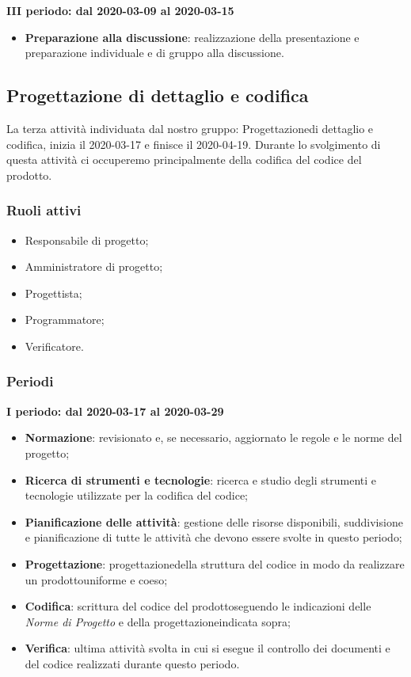 \textbf{III periodo: dal 2020-03-09 al 2020-03-15}
\begin{itemize}
	\item \textbf{Preparazione alla discussione}: realizzazione della presentazione e preparazione individuale e di gruppo alla discussione.
\end{itemize}

\subsection{Progettazione di dettaglio e codifica}
La terza attività individuata dal nostro gruppo: Progettazione\glosp di dettaglio e codifica, inizia il 2020-03-17 e finisce il 2020-04-19. Durante lo svolgimento di questa attività ci occuperemo principalmente della codifica del codice del prodotto\glo.

\subsubsection{Ruoli attivi}
\begin{itemize}
	\item Responsabile di progetto\glo;
	\item Amministratore di progetto\glo;
	\item Progettista;
	\item Programmatore;
	\item Verificatore.
\end{itemize}

\subsubsection{Periodi}
\textbf{I periodo: dal 2020-03-17 al 2020-03-29}
\begin{itemize}
	\item \textbf{Normazione}: revisionato e, se necessario, aggiornato le regole e le norme del progetto\glo;
	\item \textbf{Ricerca di strumenti e tecnologie}: ricerca e studio degli strumenti e tecnologie utilizzate per la codifica del codice;
	\item \textbf{Pianificazione delle attività}: gestione delle risorse disponibili, suddivisione e pianificazione di tutte le attività che devono essere svolte in questo periodo;
	\item \textbf{Progettazione}\glo: progettazione\glosp della struttura del codice in modo da realizzare un prodotto\glosp uniforme e coeso;
	\item \textbf{Codifica}: scrittura del codice del prodotto\glosp seguendo le indicazioni delle \textit{Norme di Progetto} e della progettazione\glosp indicata sopra; 
	\item \textbf{Verifica}: ultima attività svolta in cui si esegue il controllo dei documenti e del codice realizzati durante questo periodo.
\end{itemize}


